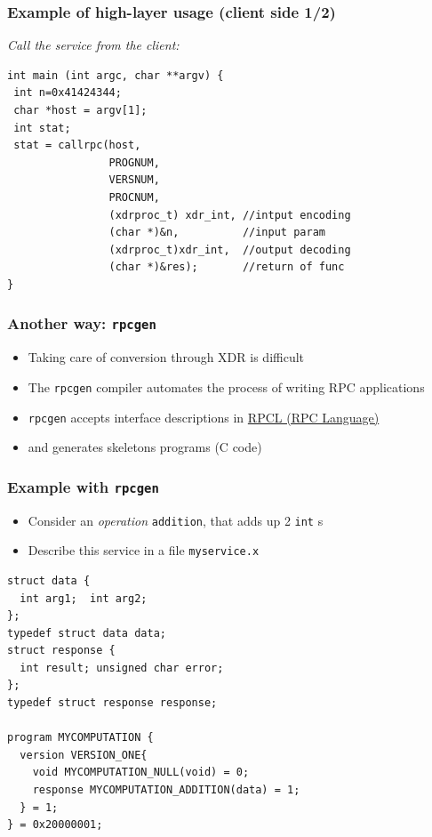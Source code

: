 \documentclass[bigger,hyperref={colorlinks=true, urlcolor=red, plainpages=false, pdfpagelabels, bookmarksnumbered}]{beamer}
\begin{document}
\begin{frame}[fragile]
\frametitle{Example of high-layer usage (client side 1/2)}
\label{sec-2-12}

   \emph{Call the service from the client:}

\lstset{language=C}
\begin{lstlisting}
int main (int argc, char **argv) {
 int n=0x41424344;
 char *host = argv[1];
 int stat;
 stat = callrpc(host,
                PROGNUM,
                VERSNUM,
                PROCNUM,
                (xdrproc_t) xdr_int, //intput encoding
                (char *)&n,          //input param
                (xdrproc_t)xdr_int,  //output decoding
                (char *)&res);       //return of func
}
\end{lstlisting}
 
\end{frame}
\begin{frame}
\frametitle{Another way: \texttt{rpcgen}}
\label{sec-2-13}

\begin{itemize}
\item Taking care of conversion through XDR is difficult
\item The \texttt{rpcgen} compiler automates the process of writing RPC applications
\item \texttt{rpcgen} accepts interface descriptions in \href{http://docs.oracle.com/cd/E19683-01/816-1435/6m7rrfn9k/index.html}{RPCL (RPC Language)}
\item and generates skeletons programs (C code)
\end{itemize}
\end{frame}
\begin{frame}[fragile]
\frametitle{Example with \texttt{rpcgen}}
\label{sec-2-14}

\begin{itemize}
\item Consider an \emph{operation} \texttt{addition}, that adds up 2 \texttt{int} s
\item Describe this service in a file \texttt{myservice.x}
\end{itemize}

\lstset{language=C}
\begin{lstlisting}
struct data {
  int arg1;  int arg2;
};
typedef struct data data;
struct response {
  int result; unsigned char error;
};
typedef struct response response;

program MYCOMPUTATION {
  version VERSION_ONE{
    void MYCOMPUTATION_NULL(void) = 0;
    response MYCOMPUTATION_ADDITION(data) = 1;
  } = 1;
} = 0x20000001;
\end{lstlisting}
\end{frame}
\end{document}
